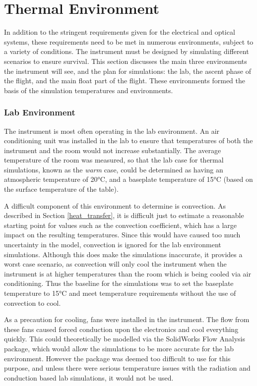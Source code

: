 \section{Thermal Environment}\label{thermal_env_ch3_sec}
In addition to the stringent requirements given for the electrical and optical systems, these requirements need to be met in numerous environments, subject to a variety of conditions. The instrument must be designed by simulating different scenarios to ensure survival. This section discusses the main three environments the instrument will see, and the plan for simulations: the lab, the ascent phase of the flight, and the main float part of the flight. These environments formed the basis of the simulation temperatures and environments. 

\subsubsection{Lab Environment}
The instrument is most often operating in the lab environment. An air conditioning unit was installed in the lab to ensure that temperatures of both the instrument and the room would not increase substantially. The average temperature of the room was measured, so that the lab case for thermal simulations, known as the \textit{warm} case, could be determined as having an atmospheric temperature of 20°C, and a baseplate temperature of 15°C (based on the surface temperature of the table).

A difficult component of this environment to determine is convection. As described in Section \ref{heat_transfer}, it is difficult just to estimate a reasonable starting point for values such as the convection coefficient, which has a large impact on the resulting temperatures. Since this would have caused too much uncertainty in the model, convection is ignored for the lab environment simulations. Although this does make the simulations inaccurate, it provides a worst case scenario, as convection will only cool the instrument when the instrument is at higher temperatures than the room which is being cooled via air conditioning. Thus the baseline for the simulations was to set the baseplate temperature to 15°C and meet temperature requirements without the use of convection to cool. 

As a precaution for cooling, fans were  installed in the instrument. The flow from these fans caused forced conduction upon the electronics and cool everything quickly. This could theoretically be modelled via the SolidWorks Flow Analysis package, which would allow the simulations to be more accurate for the lab environment. However the package was deemed too difficult to use for this purpose, and unless there were serious temperature issues with the radiation and conduction based lab simulations, it would not be used.

